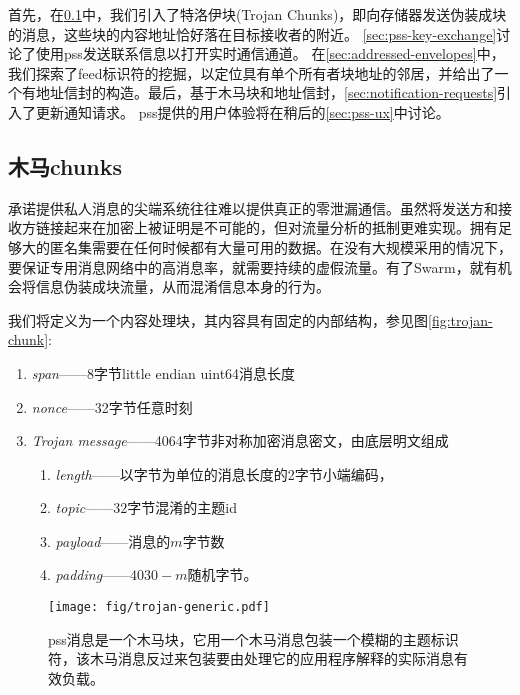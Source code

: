 首先，在\ref{sec:trojan}中，我们引入了特洛伊块(Trojan Chunks)，即向存储器发送伪装成块的消息，这些块的内容地址恰好落在目标接收者的附近。 
\ref{sec:pss-key-exchange}讨论了使用pss发送联系信息以打开实时通信通道。
在\ref{sec:addressed-envelopes}中，我们探索了feed标识符的挖掘，以定位具有单个所有者块地址的邻居，并给出了一个有地址信封的构造。最后，基于木马块和地址信封，\ref{sec:notification-requests}引入了更新通知请求。
pss提供的用户体验将在稍后的\ref{sec:pss-ux}中讨论。 

\subsection{木马chunks\statusgreen}\label{sec:trojan}

承诺提供私人消息的尖端系统往往难以提供真正的零泄漏通信\cite{kwon2016riffle}。虽然将发送方和接收方链接起来在加密上被证明是不可能的，但对流量分析的抵制更难实现。拥有足够大的匿名集需要在任何时候都有大量可用的数据。在没有大规模采用的情况下，要保证专用消息网络中的高消息率，就需要持续的虚假流量。有了Swarm，就有机会将信息伪装成块流量，从而混淆信息本身的行为。

我们将定义为一个内容处理块，其内容具有固定的内部结构，参见图\ref{fig:trojan-chunk}:

\begin{enumerate}
    \item \emph{span}——8字节little endian uint64消息长度  
    \item \emph{nonce}——32字节任意时刻 
    \item \emph{Trojan message}——4064字节非对称加密消息密文，由底层明文组成
\begin{enumerate}
        \item \emph{length}——以字节为单位的消息长度的2字节小端编码，
        \item \emph{topic}——$32$字节混淆的主题id   
        \item \emph{payload}——消息的$m$字节数 
        \item \emph{padding}——$4030-m$随机字节。
    \end{enumerate}
\end{enumerate}

\begin{figure}[htbp]
\centering
\texttt{[image: fig/trojan-generic.pdf]}
\caption[木马块或pss message\statusgreen]{pss消息是一个木马块，它用一个木马消息包装一个模糊的主题标识符，该木马消息反过来包装要由处理它的应用程序解释的实际消息有效负载。}
\label{fig:trojan-generic}
\end{figure}

